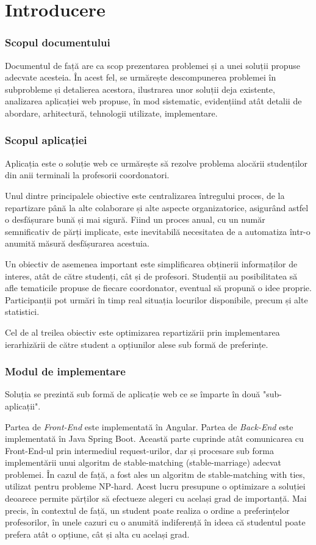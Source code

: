 \chapter*{Introducere} 

\subsection{Scopul documentului}
Documentul de față are ca scop prezentarea problemei și a unei soluții propuse adecvate acesteia. În acest fel, se urmărește descompunerea problemei în subprobleme și detalierea acestora, ilustrarea unor soluții deja existente, analizarea aplicației web propuse, în mod sistematic, evidențiind atât detalii de abordare, arhitectură, tehnologii utilizate, implementare.

\subsection{Scopul aplicației}
Aplicația \textit{\thesistitle{}} este o soluție web ce urmărește să rezolve problema alocării studenților din anii terminali la profesorii coordonatori.

Unul dintre principalele obiective este centralizarea întregului proces, de la repartizare până la alte colaborare și alte aspecte organizatorice, asigurând astfel o desfășurare bună și mai sigură. Fiind un proces anual, cu un număr semnificativ de părți implicate, este inevitabilă necesitatea de a automatiza într-o anumită măsură desfășurarea acestuia.

Un obiectiv de asemenea important este simplificarea obținerii informaților de interes, atât de către studenți, cât și de profesori. Studenții au posibilitatea să afle tematicile propuse de fiecare coordonator, eventual să propună o idee proprie. Participanții pot urmări în timp real situația locurilor disponibile, precum și alte statistici.

Cel de al treilea obiectiv este optimizarea repartizării prin implementarea ierarhizării de către student a opțiunilor alese sub formă de preferințe.

\subsection{Modul de implementare}
Soluția se prezintă sub formă de aplicație web ce se împarte în două "sub-aplicații".

Partea de \textit{Front-End} este implementată în Angular.
Partea de \textit{Back-End} este implementată în Java Spring Boot. Această parte cuprinde atât comunicarea cu Front-End-ul prin intermediul request-urilor, dar și procesare sub forma implementării unui algoritm de stable-matching (stable-marriage) adecvat problemei. În cazul de față, a fost ales un algoritm de stable-matching with ties, utilizat pentru probleme NP-hard. Acest lucru presupune o optimizare a soluției deoarece permite părților să efectueze alegeri cu același grad de importanță. Mai precis, în contextul de față, un student poate realiza o ordine a preferințelor profesorilor, în unele cazuri cu o anumită indiferență în ideea că studentul poate prefera atât o opțiune, cât și alta cu același grad.